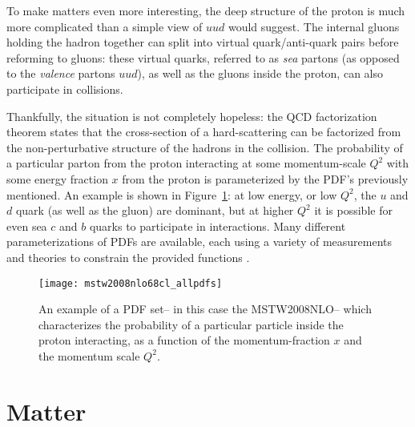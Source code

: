 To make matters even more interesting, the deep structure of the proton is much more complicated than a simple view of $uud$ would suggest. The internal gluons holding the hadron together can split into virtual quark/anti-quark pairs before reforming to gluons: these virtual quarks, referred to as \textit{sea} partons (as opposed to the \textit{valence} partons $uud$), as well as the gluons inside the proton, can also participate in collisions.

Thankfully, the situation is not completely hopeless: the QCD factorization theorem states that the cross-section of a hard-scattering can be factorized from the non-perturbative structure of the hadrons in the collision. The probability of a particular parton from the proton interacting at some momentum-scale $Q^2$ with some energy fraction $x$ from the proton is parameterized by the PDF's previously mentioned. An example is shown in Figure~\ref{fig:sm:pdf}: at low energy, or low $Q^2$, the $u$ and $d$ quark (as well as the gluon) are dominant, but at higher $Q^2$ it is possible for even sea $c$ and $b$ quarks to participate in interactions. Many different parameterizations of PDFs are available, each using a variety of measurements and theories to constrain the provided functions .




\begin{figure}
\centering
\texttt{[image: mstw2008nlo68cl\_allpdfs]}
\label{fig:sm:pdf}
\caption{An example of a PDF set-- in this case the MSTW2008NLO-- which characterizes the probability of a particular particle inside the proton interacting, as a function of the momentum-fraction $x$ and the momentum scale $Q^2$.}
\end{figure}




\section{Matter}
\label{chapter:sm:matter}

